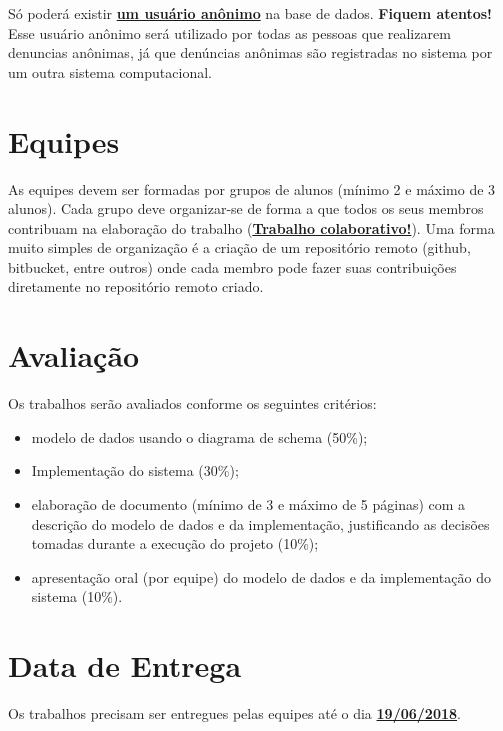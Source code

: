 \documentclass[12pt]{article}
\begin{document}
Só poderá existir \underline{\textbf{um usuário anônimo}} na base de dados. \textbf{Fiquem atentos!} Esse usuário anônimo será utilizado por todas as pessoas que realizarem denuncias anônimas, já que denúncias anônimas são registradas no sistema por um outra sistema computacional.

\section{Equipes}

As equipes devem ser formadas por grupos de alunos (mínimo 2 e máximo de 3 alunos). Cada grupo deve organizar-se de forma a que todos os seus membros contribuam na elaboração do trabalho (\underline{\textbf{Trabalho colaborativo!}}). Uma forma muito simples de organização é a criação de um repositório remoto (github, bitbucket, entre outros) onde cada membro pode fazer suas contribuições diretamente no repositório remoto criado.

\section{Avaliação}

Os trabalhos serão avaliados conforme os seguintes critérios:

\begin{itemize}
\itemsep 5mm

\item modelo de dados usando o diagrama de schema (50\%);

\item Implementação do sistema (30\%);

\item elaboração de documento (mínimo de 3 e máximo de 5 páginas) com a descrição do modelo de dados e da implementação, justificando as decisões tomadas durante a execução do projeto (10\%);

\item apresentação oral (por equipe) do modelo de dados e da implementação do sistema (10\%).

\end{itemize}

\section{Data de Entrega}

Os trabalhos precisam ser entregues pelas equipes até o dia \textbf{\underline{19/06/2018}}.
\end{document}
